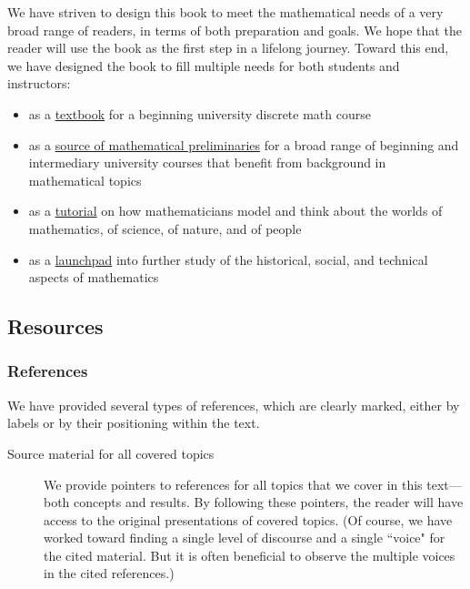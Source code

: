 We have striven to design this book to meet the mathematical needs of a very broad range of readers, in terms of both preparation and goals.   We hope that the reader will use the book as the first step in a lifelong journey.  Toward this end, we have designed the book to fill multiple needs for both students and instructors:
  \begin{itemize}
  \item
as a \underline{textbook} for a beginning university discrete math course

  \medskip\item
as a \underline{source of mathematical preliminaries} for a broad range of beginning and intermediary university courses that benefit from background in mathematical topics

  \medskip\item
as a \underline{tutorial} on how mathematicians model and think about the worlds of mathematics, of science, of nature, and of people

  \medskip\item
as a \underline{launchpad} into further study of the historical, social, and technical aspects of mathematics
  \end{itemize}

\subsection{Resources}

\subsubsection{References}

We have provided several types of references, which are clearly marked, either by labels or by their positioning within the text.  
\begin{description}
\item[{\sc Source material for all covered topics}]
We provide pointers to references for all topics that we cover in this text---both concepts and results.  By following these pointers, the reader will have access to the original presentations of covered topics.  (Of course, we have worked toward finding a single level of discourse and a single ``voice" for the cited material.  But it is often beneficial to observe the multiple voices in the cited references.)
\end{description}

